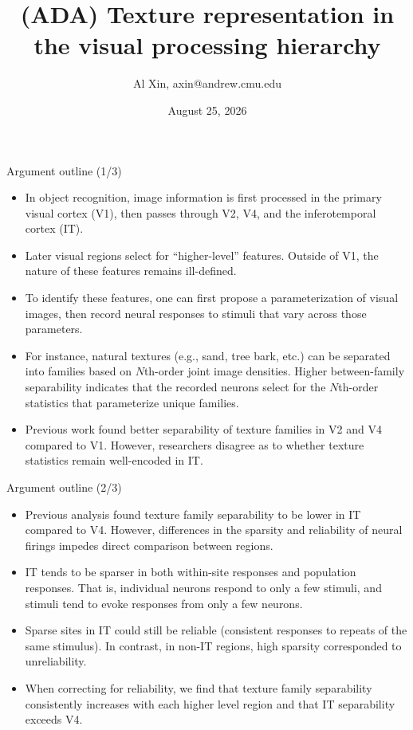 \documentclass[aspectratio=169, handout]{beamer}
\title{(ADA) Texture representation in the visual processing hierarchy}
\author{Al Xin, axin@andrew.cmu.edu}
\institute{Rob Kass (Stats and PNC), Jenelle Feather (Psych and NI)}
\date{August 25, 2026}
\begin{document}
\begin{frame}
\titlepage
\end{frame}

\begin{frame}{Argument outline (1/3)}
\small
\begin{itemize}
    \item In object recognition, image information is first processed in the primary visual cortex (V1), then passes through V2, V4, and the inferotemporal cortex (IT). 
    \item Later visual regions select for ``higher-level'' features. Outside of V1, the nature of these features remains ill-defined. 
    \item To identify these features, one can first propose a parameterization of visual images, then record neural responses to stimuli that vary across those parameters.   
    \item For instance, natural textures (e.g., sand, tree bark, etc.) can be separated into families based on \( N \)th-order joint image densities. Higher between-family separability indicates that the recorded neurons select for the \(N\)th-order statistics that parameterize unique families. 
    \item Previous work found better separability of texture families in V2 and V4 compared to V1. However, researchers disagree as to whether texture statistics remain well-encoded in IT. 
\end{itemize}
\end{frame}

\begin{frame}{Argument outline (2/3)}
\small 
\begin{itemize}
    \item Previous analysis found texture family separability to be lower in IT compared to V4. However, differences in the sparsity and reliability of neural firings impedes direct comparison between regions. 
    \item IT tends to be sparser in both within-site responses and population responses. That is, individual neurons respond to only a few stimuli, and stimuli tend to evoke responses from only a few neurons. 
    \item Sparse sites in IT could still be reliable (consistent responses to repeats of the same stimulus). In contrast, in non-IT regions, high sparsity corresponded to unreliability. 
    \item When correcting for reliability, we find that texture family separability consistently increases with each higher level region and that IT separability exceeds V4.
\end{itemize}
\end{frame}
\end{document}

